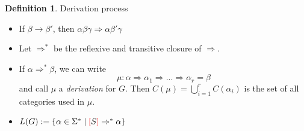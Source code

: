 \documentclass[12pt]{extarticle}
\theoremstyle{definition} \newtheorem{defn}{Definition}
\theoremstyle{definition} \newtheorem{prop}{Proposition}
\newcommand{\lb}{\textcolor{red}{[}}
\newcommand{\rb}{\textcolor{red}{]}}
\begin{document}
\begin{defn}
    Derivation process
    \begin{itemize}
        \item If $\beta \rightarrow \beta'$, then $\alpha \beta \gamma \Rightarrow \alpha \beta' \gamma$
        \item Let $\Rightarrow^*$ be the reflexive and transitive closure of $\Rightarrow$.
        \item If $\alpha \Rightarrow^* \beta$, we can write
            \[ \mu: \alpha \Rightarrow \alpha_1 \Rightarrow ... \Rightarrow \alpha_r = \beta \]
            and call $\mu$ a \emph{derivation} for $G$. Then $C(\mu) = \bigcup\limits_{i=1}^{r} C(\alpha_i)$
            is the set of all categories used in $\mu$.
        \item $L(G) := \{ \alpha \in \Sigma^* \mid \lb S \rb \Rightarrow^* \alpha \}$
    \end{itemize}
\end{defn}
\end{document}
